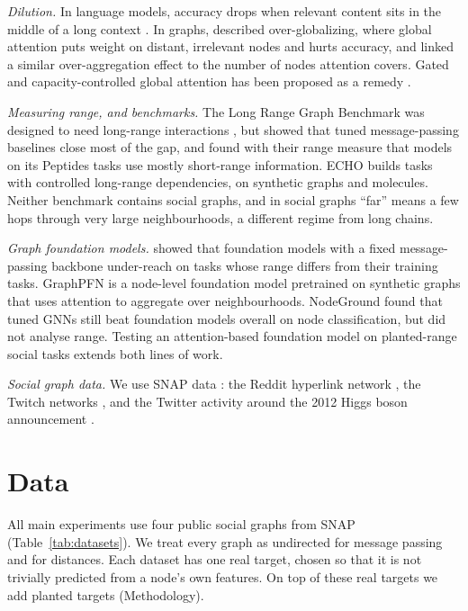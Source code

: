 \textit{Dilution.} In language models, accuracy drops when relevant content sits in the middle of a long context \citep{liu2024}. In graphs, \citet{xing2024} described over-globalizing, where global attention puts weight on distant, irrelevant nodes and hurts accuracy, and \citet{sun2025} linked a similar over-aggregation effect to the number of nodes attention covers. Gated and capacity-controlled global attention has been proposed as a remedy \citep{liu2026}.

\textit{Measuring range, and benchmarks.} The Long Range Graph Benchmark was designed to need long-range interactions \citep{dwivedi2022}, but \citet{tonshoff2024} showed that tuned message-passing baselines close most of the gap, and \citet{bamberger2025} found with their range measure that models on its Peptides tasks use mostly short-range information. ECHO \citep{miglior2025} builds tasks with controlled long-range dependencies, on synthetic graphs and molecules. Neither benchmark contains social graphs, and in social graphs ``far'' means a few hops through very large neighbourhoods, a different regime from long chains.

\textit{Graph foundation models.} \citet{f_gutteridge2026} showed that foundation models with a fixed message-passing backbone under-reach on tasks whose range differs from their training tasks. GraphPFN \citep{f_eremeev2026} is a node-level foundation model pretrained on synthetic graphs that uses attention to aggregate over neighbourhoods. NodeGround \citep{f_lee2026} found that tuned GNNs still beat foundation models overall on node classification, but did not analyse range. Testing an attention-based foundation model on planted-range social tasks extends both lines of work.

\textit{Social graph data.} We use SNAP data \citep{f_leskovec2014}: the Reddit hyperlink network \citep{kumar2018}, the Twitch networks \citep{f_rozemberczki2021,f_rozemberczki2021b}, and the Twitter activity around the 2012 Higgs boson announcement \citep{f_dedomenico2013}.

\section{Data}
All main experiments use four public social graphs from SNAP \citep{f_leskovec2014} (Table~\ref{tab:datasets}). We treat every graph as undirected for message passing and for distances. Each dataset has one real target, chosen so that it is not trivially predicted from a node's own features. On top of these real targets we add planted targets (Methodology).

